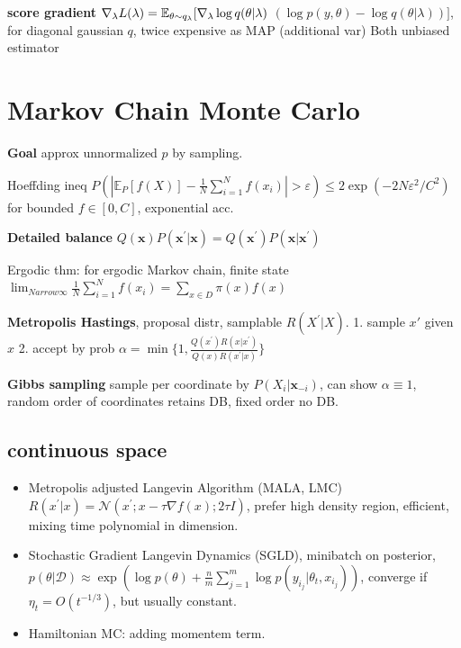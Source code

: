 \textbf{score gradient} $\nabla_\lambda L(\lambda)=\mathbb{E}_{\theta {\small \sim} q_\lambda}[\nabla_\lambda \log q(\theta | \lambda)$ $(\log p(y, \theta)-\log q(\theta | \lambda))]$, for diagonal gaussian $q$, twice expensive as MAP (additional var)
Both unbiased estimator

\section{Markov Chain Monte Carlo}
\textbf{Goal} approx unnormalized $p$ by sampling.

Hoeffding ineq $P(|\mathbb{E}_P[f(X)]-\frac{1}{N} \sum_{i=1}^N f(x_i)|>\varepsilon) \leq 2 \exp (-2 N \varepsilon^2 / C^2)$ for bounded $f\in[0,C]$, exponential acc.

\textbf{Detailed balance} $Q(\mathbf{x}) P(\mathbf{x}^{\prime} | \mathbf{x})=Q(\mathbf{x}^{\prime}) P(\mathbf{x} | \mathbf{x}^{\prime})$

Ergodic thm: for ergodic Markov chain, finite state $\lim _{N arrow \infty} \frac{1}{N} \sum_{i=1}^N f(x_i)=\sum_{x \in D} \pi(x) f(x)$

\textbf{Metropolis Hastings}, proposal distr, samplable $R(X^{\prime} | X)$. 1. sample $x'$ given $x$ 2. accept by prob $\alpha=\min \{1, \frac{Q(x^{\prime}) R(x | x^{\prime})}{Q(x) R(x^{\prime} | x)}\}$


\textbf{Gibbs sampling} sample per coordinate by $P(X_i | \boldsymbol{x}_{-i})$, can show $\alpha \equiv 1$, random order of coordinates retains DB, fixed order no DB. 

\subsection{continuous space}
\begin{itemize} [itemsep=0pt,topsep=0pt, leftmargin=2pt, itemindent=5pt, labelwidth=5pt]
    \item Metropolis adjusted Langevin Algorithm (MALA, LMC) $R(x^{\prime} | x)=\mathcal{N}(x^{\prime} ; x-\tau \nabla f(x) ; 2 \tau I)$,  prefer high density region, efficient, mixing time polynomial in dimension.
    \item Stochastic Gradient Langevin Dynamics (SGLD), minibatch on posterior, $p(\theta|\mathcal{D})\approx \exp(\log p(\theta) + \frac{n}{m} \sum_{j=1}^m \log p(y_{i_j} | \theta_t, x_{i_j}))$, converge if $\eta_t=O(t^{-1/3})$, but usually constant.
    \item Hamiltonian MC: adding momentem term.
\end{itemize}

